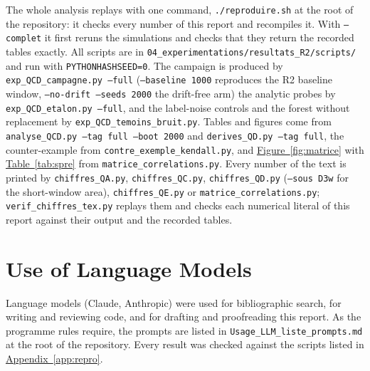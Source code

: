 \documentclass[10pt,conference]{IEEEtran}
\theoremstyle{definition}
\begin{document}
{\raggedright
The whole analysis replays with one command, \texttt{./reproduire.sh} at the root of the
repository: it checks every number of this report and recompiles it. With
\texttt{--complet} it first reruns the simulations and checks that they return the recorded
tables exactly. All scripts are in \texttt{04\_experimentations/resultats\_R2/scripts/} and run with
\texttt{PYTHONHASHSEED=0}. The campaign is produced by \texttt{exp\_QCD\_campagne.py --full}
(\texttt{--baseline 1000} reproduces the R2 baseline window, \texttt{--no-drift --seeds 2000} the
drift-free arm) the analytic probes by \texttt{exp\_QCD\_etalon.py --full}, and the label-noise controls
and the forest without replacement by \texttt{exp\_QCD\_temoins\_bruit.py}. Tables and
figures come from \texttt{analyse\_QCD.py --tag full --boot 2000} and
\texttt{derives\_QD.py --tag full}, the counter-example from
\texttt{contre\_exemple\_kendall.py}, and \hyperref[fig:matrice]{Figure~\ref*{fig:matrice}} with
\hyperref[tab:spre]{Table~\ref*{tab:spre}} from \texttt{matrice\_correlations.py}. Every number of the text is
printed by \texttt{chiffres\_QA.py}, \texttt{chiffres\_QC.py}, \texttt{chiffres\_QD.py}
(\texttt{--sous D3w} for the short-window area), \texttt{chiffres\_QE.py} or
\texttt{matrice\_correlations.py}; \texttt{verif\_chiffres\_tex.py} replays them and checks
each numerical literal of this report against their output and the recorded tables.

\par}

\section{Use of Language Models}
\label{app:llm}

Language models (Claude, Anthropic) were used for bibliographic search, for writing and
reviewing code, and for drafting and proofreading this report. As the programme rules
require, the prompts are listed in \texttt{Usage\_LLM\_liste\_prompts.md} at the root of the
repository. Every result was checked against the scripts listed in
\hyperref[app:repro]{Appendix~\ref*{app:repro}}.
\end{document}
